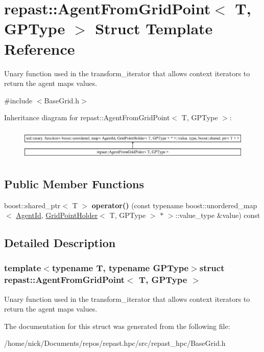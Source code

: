 \hypertarget{structrepast_1_1_agent_from_grid_point}{\section{repast\-:\-:Agent\-From\-Grid\-Point$<$ T, G\-P\-Type $>$ Struct Template Reference}
\label{structrepast_1_1_agent_from_grid_point}
}


Unary function used in the transform\-\_\-iterator that allows context iterators to return the agent maps values.  




{\ttfamily \#include $<$Base\-Grid.\-h$>$}

Inheritance diagram for repast\-:\-:Agent\-From\-Grid\-Point$<$ T, G\-P\-Type $>$\-:\begin{figure}[H]
\begin{center}
\leavevmode
\includegraphics[height=1.505376cm]{structrepast_1_1_agent_from_grid_point}
\end{center}
\end{figure}
\subsection*{Public Member Functions}
\begin{DoxyCompactItemize}
\item 
\hypertarget{structrepast_1_1_agent_from_grid_point_a6ac944644e16ab7ccfb47c0a1acbadae}{boost\-::shared\-\_\-ptr$<$ T $>$ {\bfseries operator()} (const typename boost\-::unordered\-\_\-map$<$ \hyperlink{classrepast_1_1_agent_id}{Agent\-Id}, \hyperlink{structrepast_1_1_grid_point_holder}{Grid\-Point\-Holder}$<$ T, G\-P\-Type $>$ $\ast$ $>$\-::value\-\_\-type \&value) const }\label{structrepast_1_1_agent_from_grid_point_a6ac944644e16ab7ccfb47c0a1acbadae}

\end{DoxyCompactItemize}


\subsection{Detailed Description}
\subsubsection*{template$<$typename T, typename G\-P\-Type$>$struct repast\-::\-Agent\-From\-Grid\-Point$<$ T, G\-P\-Type $>$}

Unary function used in the transform\-\_\-iterator that allows context iterators to return the agent maps values. 

The documentation for this struct was generated from the following file\-:\begin{DoxyCompactItemize}
\item 
/home/nick/\-Documents/repos/repast.\-hpc/src/repast\-\_\-hpc/Base\-Grid.\-h\end{DoxyCompactItemize}
